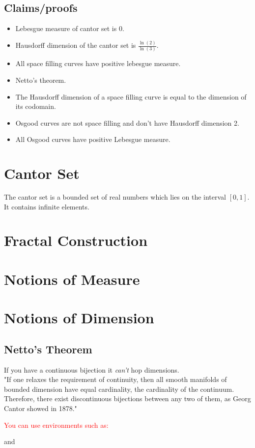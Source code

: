 \documentclass[11pt]{ekblite}
\newcommand\aaron[1]{\textcolor{red}{#1}}
\begin{document}
		\subsection{Claims/proofs}
		\begin{itemize}
			\item Lebesgue measure of cantor set is 0.
			\item Hausdorff dimension of the cantor set is $\frac{\ln (2)}{\ln (3)}$.
			\item All space filling curves have positive lebesgue measure.
			\item Netto's theorem.
			\item The Hausdorff dimension of a space filling curve is equal to the dimension of its codomain.
			\item Osgood curves are not space filling and don't have Hausdorff dimension 2.
			\item All Osgood curves have positive Lebesgue measure.
		\end{itemize}
	\newpage
	\section{Cantor Set}
	The cantor set is a bounded set of real numbers which lies on the interval $[0,1]$. It contains infinite elements. 
	\newpage
	\section{Fractal Construction}
    \section{Notions of Measure}
    \section{Notions of Dimension}
	\subsection{Netto's Theorem}
	If you have a continuous bijection it \textit{can't} hop dimensions.
	\\[0.2in]
    "If one relaxes the requirement of continuity, then all smooth manifolds of bounded dimension have equal cardinality, the cardinality of the continuum. Therefore, there exist discontinuous bijections between any two of them, as Georg Cantor showed in 1878."

\aaron{You can use environments such as:}
    \begin{theorem}
        
    \end{theorem}
    and 
    \begin{definition}
        
    \end{definition}


	


\end{document}
